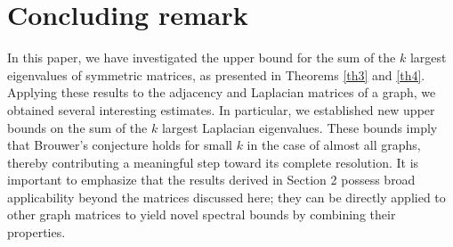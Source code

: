\documentclass[12pt]{article}
\begin{document}
\section{Concluding remark}
In this paper, we have investigated the upper bound for the sum of
the $k$ largest eigenvalues of symmetric matrices, as presented in
Theorems \ref{th3} and \ref{th4}. Applying these results to the
adjacency and Laplacian matrices of a graph, we obtained several
interesting estimates. In particular, we established new upper
bounds on the sum of the $k$ largest Laplacian eigenvalues. These
bounds imply that Brouwer's conjecture holds for small $k$ in the
case of almost all graphs, thereby contributing a meaningful step
toward its complete resolution. It is important to emphasize that the results derived in Section 2 possess broad applicability beyond the matrices discussed here; they can be directly applied to other graph matrices to yield novel spectral bounds by combining their properties.
\end{document}
